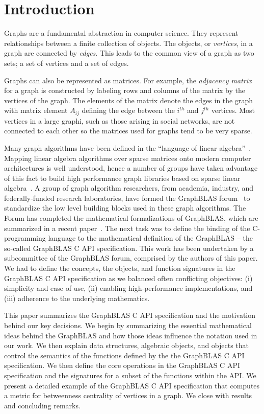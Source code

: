 \section{Introduction}
\label{sec:intro}

Graphs are a fundamental abstraction in computer science.  They represent
relationships between a finite collection of objects.   The objects, or
\emph{vertices}, in a graph are connected by \emph{edges}.  This leads
to the common view of a graph as two sets;  a set of vertices and a set
of edges.

Graphs can also be represented as matrices.   For example, the
\emph{adjacency matrix} for a graph is constructed by labeling rows and
columns of the matrix by the vertices of the graph.  The elements of
the matrix denote the edges in the graph with matrix element $A_{ij}$
defining the edge between the $i^{th}$ and $j^{th}$ vertices.  Most
vertices in a large graphi, such as those arising in social networks,
are not connected to each other so the matrices used for graphs tend to
be very sparse.

Many graph algorithms have been defined in the ``language of linear
algebra''~\cite{kepner2011graph}.  Mapping linear algebra algorithms over
sparse matrices onto modern computer architectures is well understood,
hence a number of groups have taken advantage of this fact to build high
performance graph libraries based on sparse linear algebra~\cite{combblas,
gadepally2015graphulo, gpi2016, sundaram2015graphmat}.  A group
of graph algorithm researchers, from academia, industry, and
federally-funded research laboratories, have formed the GraphBLAS
forum~\cite{graphblas_web} to standardize the low level building
blocks used in these graph algorithms.  The Forum has completed the
mathematical formalizations of GraphBLAS, which are summarized in a
recent paper~\cite{mathgraphblas16}.  The next task was to define the
binding of the C-programming language to the mathematical definition of
the GraphBLAS -- the so-called GraphBLAS C API specification.   This work
has been undertaken by a subcommittee of the GraphBLAS forum, comprised by
the authors of this paper.  We had to define the concepts, the objects,
and function signatures in the GraphBLAS C API specification as we
balanced often conflicting objectives: (i) simplicity and ease of use,
(ii) enabling high-performance implementations, and (iii) adherence to
the underlying mathematics.

This paper summarizes the GraphBLAS C API specification and the
motivation behind our key decisions.  We begin by summarizing the
essential mathematical ideas behind the GraphBLAS and how those ideas
influence the notation used in our work.  We then explain data structures,
algebraic objects, and objects that control the semantics of the functions
defined by the the GraphBLAS C API specification.   We then define the
core operations in the GraphBLAS C API specification and the signatures
for a subset of the functions  within the API.  We present a detailed
example of the GraphBLAS C API specification that computes a metric for
betweenness centrality of vertices in a graph.  We close with results
and concluding remarks.
